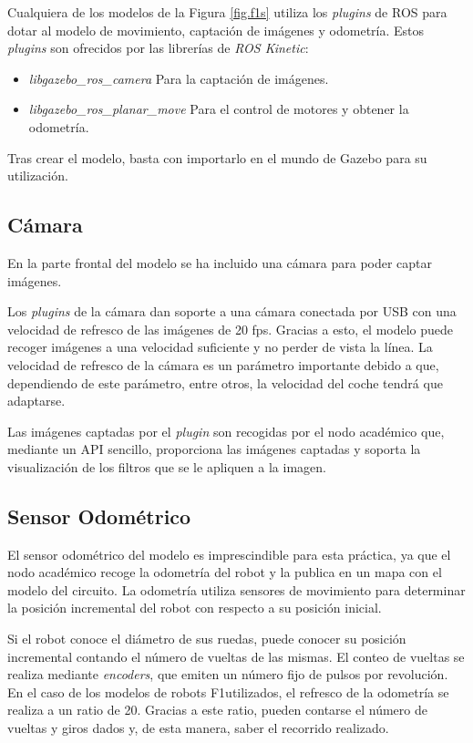 Cualquiera de los modelos de la Figura \ref{fig.f1s} utiliza los \textit{plugins} de ROS para dotar al modelo de movimiento, captación de imágenes y odometría. Estos \textit{plugins} son ofrecidos por las librerías de \textit{ROS Kinetic}:

\begin{itemize}
	\item \textit{libgazebo\_ros\_camera}
Para la captación de imágenes.
	\item \textit{libgazebo\_ros\_planar\_move}
Para el control de motores y obtener la odometría.
\end{itemize}

Tras crear el modelo, basta con importarlo en el mundo de Gazebo para su utilización.

\subsection{Cámara}
En la parte frontal del modelo se ha incluido una cámara para poder captar imágenes.

Los \textit{plugins} de la cámara dan soporte a una cámara conectada por USB con una velocidad de refresco de las imágenes de 20 fps. Gracias a esto, el modelo puede recoger imágenes a una velocidad suficiente y no perder de vista la línea. La velocidad de refresco de la cámara es un parámetro importante debido a que, dependiendo de este parámetro, entre otros, la velocidad del coche tendrá que adaptarse.

Las imágenes captadas por el \textit{plugin} son recogidas por el nodo académico que, mediante un API sencillo, proporciona las imágenes captadas y soporta la visualización de los filtros que se le apliquen a la imagen.

\subsection{Sensor Odométrico}
El sensor odométrico del modelo es imprescindible para esta práctica, ya que el nodo académico recoge la odometría del robot y la publica en un mapa con el modelo del circuito. La odometría utiliza sensores de movimiento para determinar la posición  incremental del robot con respecto a su posición inicial.

Si el robot conoce el diámetro de sus ruedas, puede conocer su posición incremental contando el número de vueltas de las mismas. El conteo de vueltas se realiza mediante \textit{encoders}, que emiten un número fijo de pulsos por revolución. En el caso de los modelos de robots F1utilizados, el refresco de la odometría se realiza a un ratio de 20. Gracias a este ratio, pueden contarse el número de vueltas y giros dados y, de esta manera, saber el recorrido realizado.


